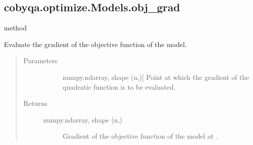 \documentclass[letterpaper,10pt,english]{sphinxmanual}
\begin{document}
\begin{fulllineitems}
\begin{fulllineitems}
\begin{quote}
\begin{description}
\begin{description}
\end{description}

\end{description}\end{quote}

\end{fulllineitems}



\subsection{cobyqa.optimize.Models.obj\_grad}
\label{\detokenize{refs/generated/cobyqa.optimize.Models.obj_grad:cobyqa-optimize-models-obj-grad}}\label{\detokenize{refs/generated/cobyqa.optimize.Models.obj_grad::doc}}
\sphinxAtStartPar
method

\begin{fulllineitems}
\label{\detokenize{refs/generated/cobyqa.optimize.Models.obj_grad:cobyqa.optimize.Models.obj_grad}}
\sphinxAtStartPar
Evaluate the gradient of the objective function of the model.
\begin{quote}\begin{description}
\item[{Parameters}] \leavevmode\begin{description}
\item[{}] \leavevmode{[}numpy.ndarray, shape (n,){]}
\sphinxAtStartPar
Point at which the gradient of the quadratic function is to be
evaluated.

\end{description}

\item[{Returns}] \leavevmode\begin{description}
\item[{numpy.ndarray, shape (n,)}] \leavevmode
\sphinxAtStartPar
Gradient of the objective function of the model at .

\end{description}

\end{description}\end{quote}

\end{fulllineitems}




\end{fulllineitems}
\end{document}
